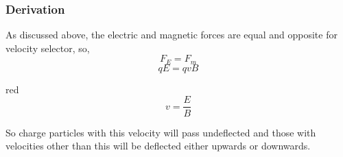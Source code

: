 \subsubsection{Derivation}
As discussed above, the electric and magnetic forces are equal and opposite for velocity selector, so,
\begin{equation}\nonumber
    F_{E}=F_{m}
\end{equation}
\begin{equation}\nonumber
    qE = qvB
\end{equation}
\begin{mybox}{red}{}
\begin{equation}\label{eq:13.35}
    v = \frac{E}{B}
\end{equation}
\end{mybox}
So charge particles with this velocity will pass undeflected and those with velocities other than this will be deflected either upwards or downwards.
